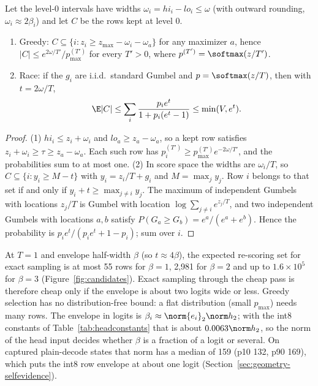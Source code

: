 \begin{proposition}\label{prop:candidates}
Let the level-0 intervals have widths $\omega_i=hi_i-lo_i\le\omega$ (with outward rounding, $\omega_i\approx2\beta_i$) and let $C$ be the rows kept at level 0.
\begin{enumerate}
\item Greedy: $C\subseteq\{i:z_i\ge z_{\max}-\omega_i-\omega_a\}$ for any maximizer $a$, hence $|C|\le e^{2\omega/T'}/p^{(T')}_{\max}$ for every $T'>0$, where $p^{(T')}=\softmax(z/T')$.
\item Race: if the $g_i$ are i.i.d.\ standard Gumbel and $p=\softmax(z/T)$, then with $t=2\omega/T$,
\[\E|C|\le\sum_i\frac{p_ie^t}{1+p_i(e^t-1)}\le\min(V,e^t).\]
\end{enumerate}
\end{proposition}
\begin{proof}
(1) $hi_i\le z_i+\omega_i$ and $lo_a\ge z_a-\omega_a$, so a kept row satisfies $z_i+\omega_i\ge\tau\ge z_a-\omega_a$. Each such row has $p^{(T')}_i\ge p^{(T')}_{\max}e^{-2\omega/T'}$, and the probabilities sum to at most one. (2) In score space the widths are $\omega_i/T$, so $C\subseteq\{i:y_i\ge M-t\}$ with $y_i=z_i/T+g_i$ and $M=\max_jy_j$. Row $i$ belongs to that set if and only if $y_i+t\ge\max_{j\ne i}y_j$. The maximum of independent Gumbels with locations $z_j/T$ is Gumbel with location $\log\sum_{j\ne i}e^{z_j/T}$, and two independent Gumbels with locations $a,b$ satisfy $P(G_a\ge G_b)=e^a/(e^a+e^b)$. Hence the probability is $p_ie^t/(p_ie^t+1-p_i)$; sum over $i$.
\end{proof}
At $T=1$ and envelope half-width $\beta$ (so $t\approx4\beta$), the expected re-scoring set for exact sampling is at most 55 rows for $\beta=1$, 2,981 for $\beta=2$ and up to $1.6\times10^5$ for $\beta=3$ (Figure~\ref{fig:candidates}). Exact sampling through the cheap pass is therefore cheap only if the envelope is about two logits wide or less. Greedy selection has no distribution-free bound: a flat distribution (small $p_{\max}$) needs many rows. The envelope in logits is $\beta_i\approx\norm{e_i}_2\norm h_2$; with the int8 constants of Table~\ref{tab:headconstants} that is about $0.0063\norm h_2$, so the norm of the head input decides whether $\beta$ is a fraction of a logit or several. On captured plain-decode states that norm has a median of 159 (p10 132, p90 169), which puts the int8 row envelope at about one logit (Section~\ref{sec:geometry-selfevidence}).

